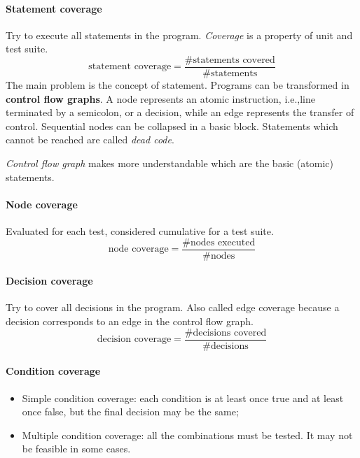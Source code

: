 \paragraph{Statement coverage} Try to execute all statements in the program. \emph{Coverage} is a property of unit and test suite.
\[
\text{statement coverage} = \dfrac{\text{\# statements covered}}{\text{\# statements}}
\]
The main problem is the concept of statement. Programs can be transformed in \textbf{control flow graphs}. A node represents an atomic instruction, i.e.,\@ line terminated by a semicolon, or a decision, while an edge represents the transfer of control. Sequential nodes can be collapsed in a basic block. Statements which cannot be reached are called \emph{dead code}.

\emph{Control flow graph} makes more understandable which are the basic (atomic) statements.

\paragraph{Node coverage} Evaluated for each test, considered cumulative for a test suite.
\[
\text{node coverage} = \dfrac{\text{\# nodes executed}}{\text{\# nodes}}
\]

\paragraph{Decision coverage} Try to cover all decisions in the program. Also called edge coverage because a decision corresponds to an edge in the control flow graph.
\[
\text{decision coverage} = \dfrac{\text{\# decisions covered}}{\text{\# decisions}}
\]

\paragraph{Condition coverage}
\begin{itemize}
\item Simple condition coverage: each condition is at least once true and at least once false, but the final decision may be the same;
\item Multiple condition coverage: all the combinations must be tested. It may not be feasible in some cases.
\end{itemize}

